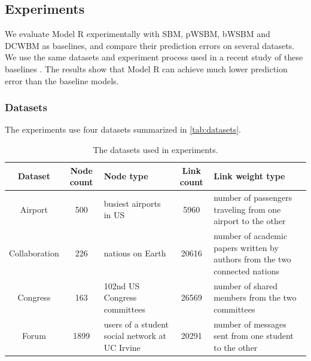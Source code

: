 \documentclass{article}
\begin{document}
\subsection{Experiments}
We evaluate Model R experimentally with SBM, pWSBM, bWSBM and DCWBM as baselines,
and compare their prediction errors on several datasets.
We use the same datasets and experiment process used in a recent study of these baselines \cite{aicher2014learning}.
The results show 
that Model R can achieve much lower prediction error than the baseline models.

\subsubsection{Datasets}
The experiments use four datasets summarized in \autoref{tab:datasets}.
\begin{table}[!htb]\centering
	\caption{The datasets used in experiments.}
	\begin{tabularx}{\textwidth}{|c|c|X|c|X|}  \hline \rowcolor{blue!40}
		Dataset & Node count & Node type & Link count & Link weight type \\ \hline
		Airport\cite{colizza2007reaction} & 500 & busiest airports in US & 5960 & number of passengers traveling from one airport to the other\\ \hline
		Collaboration\cite{pan2012world} & 226 & nations on Earth & 20616 & number of academic papers written by authors from the two connected nations \\ \hline
		Congress\cite{porter2005network} & 163  & 102nd US Congress committees & 26569 & number of shared members from the two committees \\ \hline
		Forum\cite{opsahl2009clustering}  & 1899 & users of a student social network at UC Irvine & 20291 & number of messages sent from one student to the other \\ \hline
	\end{tabularx}
	\label{tab:datasets}
\end{table}
\end{document}
